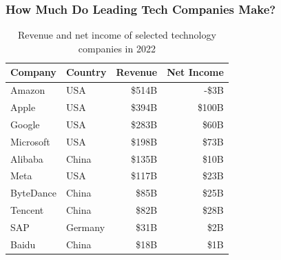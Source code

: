 \documentclass[aspectratio=169]{beamer}
\begin{document}
    \begin{frame}
        \frametitle{How Much Do Leading Tech Companies Make?}
        \begin{table}
            \centering
            \begin{tabular}{llrr}
                \toprule
                Company   & Country & Revenue & Net Income \\
                \midrule
                Amazon    & USA     & \$514B  & -\$3B      \\
                Apple     & USA     & \$394B  & \$100B     \\
                Google    & USA     & \$283B  & \$60B      \\
                Microsoft & USA     & \$198B  & \$73B      \\
                Alibaba   & China   & \$135B  & \$10B      \\
                Meta      & USA     & \$117B  & \$23B      \\
                ByteDance & China   & \$85B   & \$25B      \\
                Tencent   & China   & \$82B   & \$28B      \\
                SAP       & Germany & \$31B   & \$2B       \\
                Baidu     & China   & \$18B   & \$1B       \\
                \bottomrule
            \end{tabular}
            \caption{Revenue and net income of selected technology companies in 2022}
        \end{table}
    \end{frame}
\end{document}
